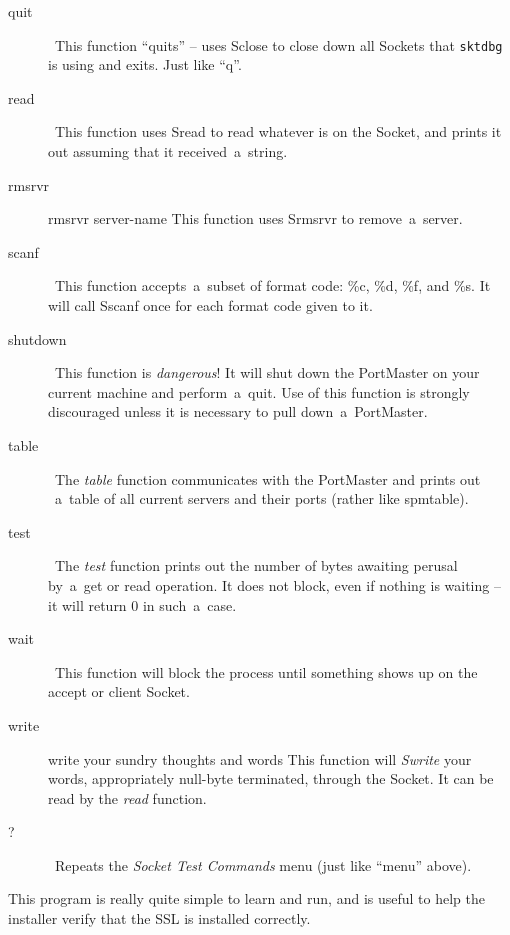 \documentclass[12pt]{article}
\def\SSL{{\small SSL}}
\begin{document}
\begin{description}
  \item[quit] \   This function ``quits'' -- uses Sclose to close down all Sockets that
  \verb`sktdbg` is using and exits.  Just like ``q''.

  \item[read] \   This function uses Sread to read whatever is on the Socket, and prints
  it out assuming that it received~a~string.

  \item[rmsrvr] rmsrvr server-name   This function uses Srmsrvr to remove~a~server.

  \item[scanf] \   This function accepts~a~subset of format code: \%c, \%d, \%f, and \%s.
  It will call Sscanf once for each format code given to it.

  \item[shutdown] \   This function is {\em dangerous}!  It will shut down the PortMaster on
  your current machine and perform~a~quit.  Use of this function is
  strongly discouraged unless it is necessary to pull down~a~PortMaster.

  \item[table] \   The {\em table} function communicates with the PortMaster and prints out
 ~a~table of all current servers and their ports (rather like spmtable).

  \item[test] \   The {\em test} function prints out the number of bytes awaiting perusal
  by~a~get or read operation.  It does not block, even if nothing is
  waiting -- it will return 0 in such~a~case.

  \item[wait] \   This function will block the process until something shows up on the
  accept or client Socket.

  \item[write] write your sundry thoughts and words   This function will {\em Swrite} your words, appropriately null-byte
  terminated, through the Socket.  It can be read by the {\em read} function.

  \item[?] \   Repeats the {\em Socket Test Commands} menu (just like ``menu'' above).

\end{description}

This program is really quite simple to learn and run, and is useful to help
the installer verify that the {\SSL} is installed correctly.
\end{document}
